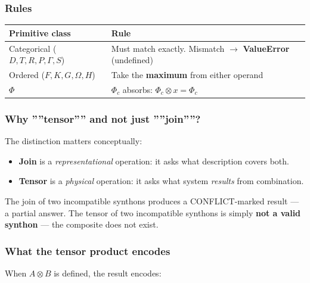 \documentclass[11pt,a4paper]{article}
\begin{document}
\subsubsection{Rules}

\begin{table}[htbp]
\centering
\small
{}
\begin{tabularx}{\textwidth}{>{\centering\arraybackslash}X >{\centering\arraybackslash}X}
\toprule
\rowcolor{gray!25}\textbf{Primitive class} & \textbf{Rule} \\
\midrule
\rowcolors{1}{white}{gray!10}
Categorical ($D, T, R, P, \Gamma, S$) & Must match exactly. Mismatch $\rightarrow$ \textbf{ValueError} (undefined) \\
Ordered ($F, K, G, \Omega, H$) & Take the \textbf{maximum} from either operand \\
$\Phi$ & $\Phi_c$ absorbs: $\Phi_c \otimes x = \Phi_c$ \\
\bottomrule
\end{tabularx}
\end{table}

\subsubsection{Why ''''tensor'''' and not just ''''join''''?}

The distinction matters conceptually:

\begin{itemize}
    \item \textbf{Join} is a \emph{representational} operation: it asks what description covers both.
    \item \textbf{Tensor} is a \emph{physical} operation: it asks what system \emph{results} from combination.
\end{itemize}

The join of two incompatible synthons produces a CONFLICT-marked result --- a partial answer. The tensor of two incompatible synthons is simply \textbf{not a valid synthon} --- the composite does not exist.

\subsubsection{What the tensor product encodes}

When $A \otimes B$ is defined, the result encodes:
\end{document}
